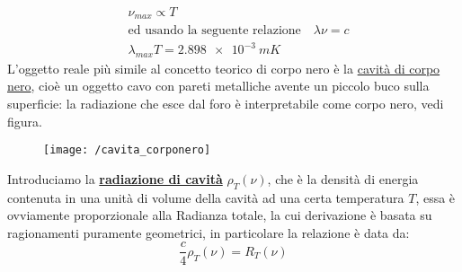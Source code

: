 \begin{equation}
\begin{split}
& \nu_{max} \propto T \\
& \mbox{ed usando la seguente relazione} \quad \lambda\nu = c \\
& \lambda_{max}T = \SI{2.898e-3}{mK}
\end{split}
\end{equation}
L'oggetto reale più simile al concetto teorico di corpo nero è la \underline{cavità di corpo nero}, cioè un oggetto cavo con pareti metalliche avente un piccolo buco sulla superficie: la radiazione che esce dal foro è interpretabile come corpo nero, vedi figura.
\begin{figure}[h]
\centering
\texttt{[image: /cavita\_corponero]}
\end{figure}
Introduciamo la \underline{\textbf{radiazione di cavità}} $\rho_T(\nu)$, che è la densità di energia contenuta in una unità di volume della cavità ad una certa temperatura $T$,
essa è ovviamente proporzionale alla Radianza totale, la cui derivazione è basata su ragionamenti puramente geometrici, in particolare la relazione è data da:
\begin{equation}
\frac{c}{4}\rho_T(\nu)=R_T(\nu)
\end{equation}


